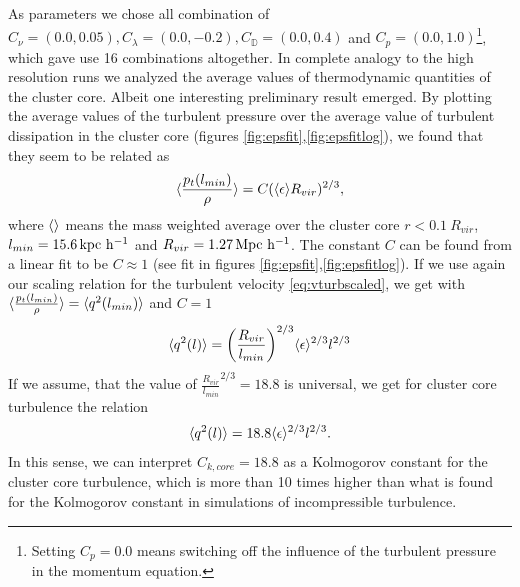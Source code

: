 As parameters we chose all combination of $C_{\nu} = (0.0, 0.05),
C_{\lambda}=(0.0,-0.2),C_{\mathbb{D}}=(0.0,0.4)$ and $C_p =
(0.0,1.0)$\footnote{Setting $C_p=0.0$ means switching off
the influence of the turbulent pressure in the momentum equation.}, which 
gave use 16 combinations altogether. In complete analogy to the high resolution
runs we analyzed the average values of thermodynamic quantities of the cluster
core. Albeit one interesting preliminary result emerged. By plotting the 
average values of the turbulent pressure over the average value of turbulent
dissipation in the cluster core (figures \ref{fig:epsfit},\ref{fig:epsfitlog}),
we found that they seem to be related as
\begin{align}
\langle \frac{p_t(l_{min})}{\rho} \rangle = 
C (\langle \epsilon \rangle R_{vir})^{2/3},\label{eq:turbeos}
\end{align}
where $\langle  \rangle$ means the mass weighted average over the cluster core
$r<0.1\ R_{vir} $, $l_{min}=\unit[15.6]{kpc\ h^{-1}}$ and $R_{vir} =
\unit[1.27]{Mpc\ h^{-1}}$. The constant $C$ can be found
from a linear fit to be $C \approx 1$ (see fit in figures
\ref{fig:epsfit},\ref{fig:epsfitlog}).
If we use again our scaling relation for the
turbulent velocity \eqref{eq:vturbscaled}, we get with
$\langle \frac{p_t(l_{min})}{\rho} \rangle = \langle q^2(l_{min}) \rangle$ and $C=1$
\begin{align}
\langle q^2(l) \rangle = { \left( \frac{R_{vir}}{l_{min}} \right) }^{2/3} \langle \epsilon \rangle^{2/3} l^{2/3}
\end{align}
If we assume, that the value of $\frac{R_{vir}}{l_{min}}^{2/3} = 18.8$ is
universal, we get for cluster core turbulence the relation
\begin{align}
\langle q^2(l) \rangle = 18.8 \langle \epsilon \rangle^{2/3} l^{2/3}.
\end{align}
In this sense, we can interpret $C_{k,core}=18.8$ as a Kolmogorov constant for
the cluster core turbulence, which is more than 10 times higher than what is
found for the Kolmogorov constant in simulations of incompressible turbulence.


